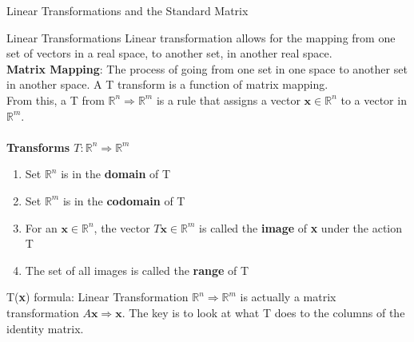 \documentclass[a4paper, 12pt]{article}
\begin{document}
\begin{section}{Linear Transformations and the Standard Matrix}
\begin{subsection}{Linear Transformations}
Linear transformation allows for the mapping from one set
of vectors in a real space, to another set, in another
real space.\\
\textbf{Matrix Mapping}: The process of going from one set in one
space to another set in another space. A T transform is a function
of matrix mapping.\\
From this, a T from $\mathbb{R}^n \Rightarrow \mathbb{R}^m$ is a 
rule that assigns a vector $\textbf{x}\in\mathbb{R}^n$ to a vector
in $\mathbb{R}^m$.\\
\\ \textbf{Transforms $T:\mathbb{R}^n \Rightarrow \mathbb{R}^m$}
\begin{enumerate}
\item{Set $\mathbb{R}^n$ is in the \textbf{domain} of T}
\item{Set $\mathbb{R}^m$ is in the \textbf{codomain} of T}
\item{For an $\textbf{x}\in\mathbb{R}^n$, the vector 
$T\textbf{x}\in\mathbb{R}^m$ is called the \textbf{image} of 
\textbf{x} under the action T}
\item{The set of all images is called the \textbf{range} of T}
\end{enumerate}
T(\textbf{x}) formula: Linear Transformation
$\mathbb{R}^n \Rightarrow \mathbb{R}^m$ is actually a matrix
transformation $A\textbf{x}\Rightarrow\textbf{x}$. The key is to 
look at what T does to the columns of the identity matrix.
\end{subsection}


\end{section}
\end{document}
